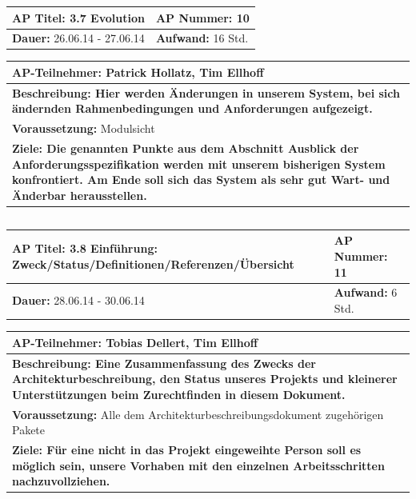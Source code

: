 \documentclass[fontsize=12pt,paper=a4,twoside]{scrartcl}
\begin{document}
\begin{tabular}{|p{7.43cm}|p{7.43cm}|}
\hline
\textbf{AP Titel: } 3.7 Evolution & \textbf{AP Nummer: }10\\ 
\hline
\textbf{Dauer: }26.06.14 - 27.06.14& \textbf{Aufwand: }16 Std.\\
\hline
\end{tabular}
\begin{tabular}{|p{15.3cm}|}
\hline
\textbf{AP-Teilnehmer: }Patrick Hollatz, Tim Ellhoff\\
\hline
\textbf{Beschreibung: Hier werden Änderungen in unserem System, bei sich ändernden Rahmenbedingungen und Anforderungen aufgezeigt.}\\
\hline
\textbf{Voraussetzung: }Modulsicht\\
\hline 
\textbf{Ziele: Die genannten Punkte aus dem Abschnitt Ausblick der Anforderungsspezifikation 
werden mit unserem bisherigen System konfrontiert. Am Ende soll sich das System als sehr gut Wart- und Änderbar herausstellen.}\\
\hline 
\end{tabular}
\begin{verbatim}

\end{verbatim}

\begin{tabular}{|p{7.43cm}|p{7.43cm}|}
\hline
\textbf{AP Titel: }3.8 Einführung: Zweck/Status/Definitionen/Referenzen/Übersicht & \textbf{AP Nummer: }11\\ 
\hline
\textbf{Dauer: }28.06.14 - 30.06.14& \textbf{Aufwand: }6 Std.\\
\hline
\end{tabular}
\begin{tabular}{|p{15.3cm}|}
\hline
\textbf{AP-Teilnehmer: }Tobias Dellert, Tim Ellhoff\\
\hline
\textbf{Beschreibung: Eine Zusammenfassung des Zwecks der Architekturbeschreibung, den Status unseres Projekts und kleinerer Unterstützungen beim Zurechtfinden in diesem Dokument.}\\
\hline
\textbf{Voraussetzung: }Alle dem Architekturbeschreibungsdokument zugehörigen Pakete\\
\hline 
\textbf{Ziele: Für eine nicht in das Projekt eingeweihte Person soll es möglich sein, unsere Vorhaben mit den einzelnen Arbeitsschritten nachzuvollziehen.}\\
\hline 
\end{tabular}
\begin{verbatim}

\end{verbatim}
\end{document}
